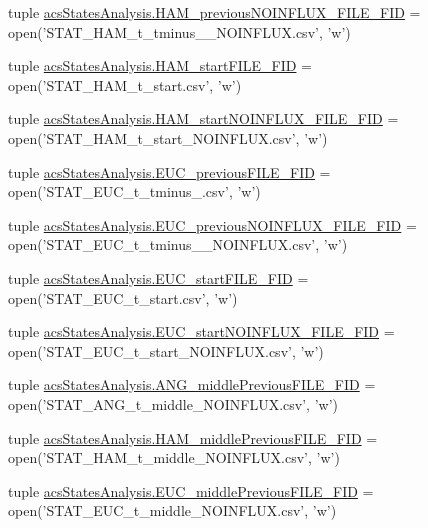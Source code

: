 \begin{DoxyCompactItemize}
tuple \hyperlink{a00098_a621d86851e86f9c83bb0add9ec741d7f}{acs\-States\-Analysis.\-H\-A\-M\-\_\-previous\-N\-O\-I\-N\-F\-L\-U\-X\-\_\-\-F\-I\-L\-E\-\_\-\-F\-I\-D} = open('S\-T\-A\-T\-\_\-\-H\-A\-M\-\_\-t\-\_\-tminus\-\_\-\_\-\-N\-O\-I\-N\-F\-L\-U\-X.\-csv', 'w')
\item 
tuple \hyperlink{a00098_abb14887e587e1107fc13046ad313077e}{acs\-States\-Analysis.\-H\-A\-M\-\_\-start\-F\-I\-L\-E\-\_\-\-F\-I\-D} = open('S\-T\-A\-T\-\_\-\-H\-A\-M\-\_\-t\-\_\-start.\-csv', 'w')
\item 
tuple \hyperlink{a00098_ab8a3b402c0b418cc290889a5f6482280}{acs\-States\-Analysis.\-H\-A\-M\-\_\-start\-N\-O\-I\-N\-F\-L\-U\-X\-\_\-\-F\-I\-L\-E\-\_\-\-F\-I\-D} = open('S\-T\-A\-T\-\_\-\-H\-A\-M\-\_\-t\-\_\-start\-\_\-\-N\-O\-I\-N\-F\-L\-U\-X.\-csv', 'w')
\item 
tuple \hyperlink{a00098_a3548edac9afffda077dcbd2876616b39}{acs\-States\-Analysis.\-E\-U\-C\-\_\-previous\-F\-I\-L\-E\-\_\-\-F\-I\-D} = open('S\-T\-A\-T\-\_\-\-E\-U\-C\-\_\-t\-\_\-tminus\-\_.\-csv', 'w')
\item 
tuple \hyperlink{a00098_aa2efc59329473a7bbeaf3ce32ec4dc3d}{acs\-States\-Analysis.\-E\-U\-C\-\_\-previous\-N\-O\-I\-N\-F\-L\-U\-X\-\_\-\-F\-I\-L\-E\-\_\-\-F\-I\-D} = open('S\-T\-A\-T\-\_\-\-E\-U\-C\-\_\-t\-\_\-tminus\-\_\-\_\-\-N\-O\-I\-N\-F\-L\-U\-X.\-csv', 'w')
\item 
tuple \hyperlink{a00098_a3d812ff298612e6aae54e7a9abfddbf2}{acs\-States\-Analysis.\-E\-U\-C\-\_\-start\-F\-I\-L\-E\-\_\-\-F\-I\-D} = open('S\-T\-A\-T\-\_\-\-E\-U\-C\-\_\-t\-\_\-start.\-csv', 'w')
\item 
tuple \hyperlink{a00098_a8ae5873fd9b162495a512e314047e930}{acs\-States\-Analysis.\-E\-U\-C\-\_\-start\-N\-O\-I\-N\-F\-L\-U\-X\-\_\-\-F\-I\-L\-E\-\_\-\-F\-I\-D} = open('S\-T\-A\-T\-\_\-\-E\-U\-C\-\_\-t\-\_\-start\-\_\-\-N\-O\-I\-N\-F\-L\-U\-X.\-csv', 'w')
\item 
tuple \hyperlink{a00098_aa5eb16eef2c90e2ccc991eb176280f21}{acs\-States\-Analysis.\-A\-N\-G\-\_\-middle\-Previous\-F\-I\-L\-E\-\_\-\-F\-I\-D} = open('S\-T\-A\-T\-\_\-\-A\-N\-G\-\_\-t\-\_\-middle\-\_\-\-N\-O\-I\-N\-F\-L\-U\-X.\-csv', 'w')
\item 
tuple \hyperlink{a00098_aaf0dd6e74d88a7cf2e909301b422c17d}{acs\-States\-Analysis.\-H\-A\-M\-\_\-middle\-Previous\-F\-I\-L\-E\-\_\-\-F\-I\-D} = open('S\-T\-A\-T\-\_\-\-H\-A\-M\-\_\-t\-\_\-middle\-\_\-\-N\-O\-I\-N\-F\-L\-U\-X.\-csv', 'w')
\item 
tuple \hyperlink{a00098_afcb9ec3ed11cfcacae8f796af7605425}{acs\-States\-Analysis.\-E\-U\-C\-\_\-middle\-Previous\-F\-I\-L\-E\-\_\-\-F\-I\-D} = open('S\-T\-A\-T\-\_\-\-E\-U\-C\-\_\-t\-\_\-middle\-\_\-\-N\-O\-I\-N\-F\-L\-U\-X.\-csv', 'w')

\end{DoxyCompactItemize}
